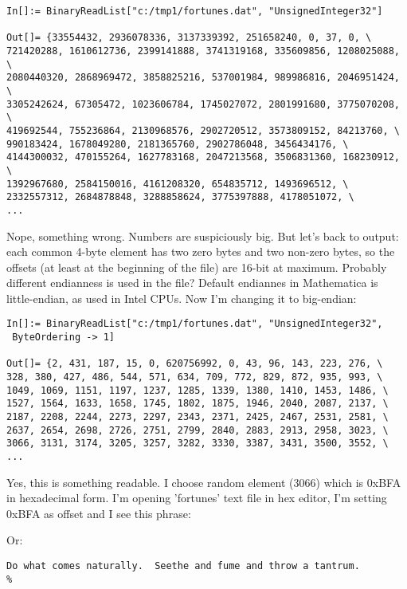 \begin{lstlisting}
In[]:= BinaryReadList["c:/tmp1/fortunes.dat", "UnsignedInteger32"]

Out[]= {33554432, 2936078336, 3137339392, 251658240, 0, 37, 0, \
721420288, 1610612736, 2399141888, 3741319168, 335609856, 1208025088, \
2080440320, 2868969472, 3858825216, 537001984, 989986816, 2046951424, \
3305242624, 67305472, 1023606784, 1745027072, 2801991680, 3775070208, \
419692544, 755236864, 2130968576, 2902720512, 3573809152, 84213760, \
990183424, 1678049280, 2181365760, 2902786048, 3456434176, \
4144300032, 470155264, 1627783168, 2047213568, 3506831360, 168230912, \
1392967680, 2584150016, 4161208320, 654835712, 1493696512, \
2332557312, 2684878848, 3288858624, 3775397888, 4178051072, \
...
\end{lstlisting}

Nope, something wrong. Numbers are suspiciously big.
But let's back to \IT{od} output: each common 4-byte element has two zero bytes and two non-zero bytes, so the offsets (at least at the beginning of the file) are 16-bit at maximum.
Probably different endianness is used in the file?
Default endiannes in Mathematica is little-endian, as used in Intel CPUs.
Now I'm changing it to big-endian:

\begin{lstlisting}
In[]:= BinaryReadList["c:/tmp1/fortunes.dat", "UnsignedInteger32", 
 ByteOrdering -> 1]

Out[]= {2, 431, 187, 15, 0, 620756992, 0, 43, 96, 143, 223, 276, \
328, 380, 427, 486, 544, 571, 634, 709, 772, 829, 872, 935, 993, \
1049, 1069, 1151, 1197, 1237, 1285, 1339, 1380, 1410, 1453, 1486, \
1527, 1564, 1633, 1658, 1745, 1802, 1875, 1946, 2040, 2087, 2137, \
2187, 2208, 2244, 2273, 2297, 2343, 2371, 2425, 2467, 2531, 2581, \
2637, 2654, 2698, 2726, 2751, 2799, 2840, 2883, 2913, 2958, 3023, \
3066, 3131, 3174, 3205, 3257, 3282, 3330, 3387, 3431, 3500, 3552, \
...
\end{lstlisting}

Yes, this is something readable.
I choose random element (3066) which is 0xBFA in hexadecimal form.
I'm opening 'fortunes' text file in hex editor, I'm setting 0xBFA as offset and I see this phrase:



Or:

\begin{lstlisting}
Do what comes naturally.  Seethe and fume and throw a tantrum.
%
\end{lstlisting}

